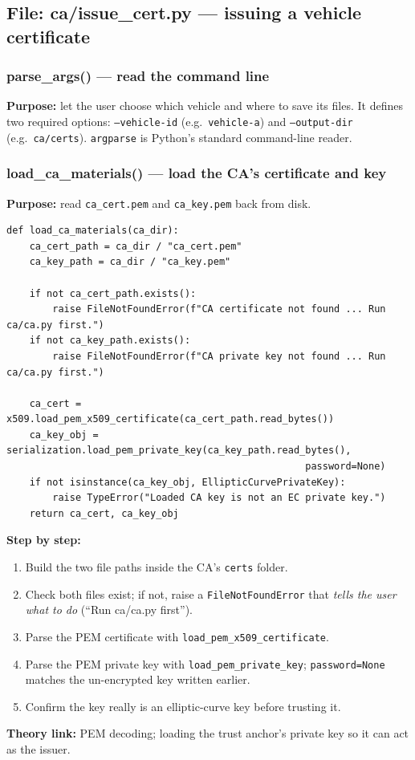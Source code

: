 \documentclass[11pt,a4paper]{article}
\begin{document}
\subsection{File: ca/issue\_cert.py --- issuing a vehicle certificate}

\subsubsection*{parse\_args() --- read the command line}
\textbf{Purpose:} let the user choose which vehicle and where to save its files.
It defines two required options: \texttt{--vehicle-id} (e.g.\ \texttt{vehicle-a})
and \texttt{--output-dir} (e.g.\ \texttt{ca/certs}). \texttt{argparse} is
Python's standard command-line reader.

\subsubsection*{load\_ca\_materials() --- load the CA's certificate and key}
\textbf{Purpose:} read \texttt{ca\_cert.pem} and \texttt{ca\_key.pem} back from disk.
\begin{lstlisting}[style=py,caption={ca/issue\_cert.py --- load the CA so we can sign with it.}]
def load_ca_materials(ca_dir):
    ca_cert_path = ca_dir / "ca_cert.pem"
    ca_key_path = ca_dir / "ca_key.pem"

    if not ca_cert_path.exists():
        raise FileNotFoundError(f"CA certificate not found ... Run ca/ca.py first.")
    if not ca_key_path.exists():
        raise FileNotFoundError(f"CA private key not found ... Run ca/ca.py first.")

    ca_cert = x509.load_pem_x509_certificate(ca_cert_path.read_bytes())
    ca_key_obj = serialization.load_pem_private_key(ca_key_path.read_bytes(),
                                                    password=None)
    if not isinstance(ca_key_obj, EllipticCurvePrivateKey):
        raise TypeError("Loaded CA key is not an EC private key.")
    return ca_cert, ca_key_obj
\end{lstlisting}
\textbf{Step by step:}
\begin{enumerate}
  \item Build the two file paths inside the CA's \texttt{certs} folder.
  \item Check both files exist; if not, raise a \texttt{FileNotFoundError} that
        \emph{tells the user what to do} (``Run ca/ca.py first'').
  \item Parse the PEM certificate with \texttt{load\_pem\_x509\_certificate}.
  \item Parse the PEM private key with \texttt{load\_pem\_private\_key};
        \texttt{password=None} matches the un-encrypted key written earlier.
  \item Confirm the key really is an elliptic-curve key before trusting it.
\end{enumerate}
\textbf{Theory link:} PEM decoding; loading the trust anchor's private key so it
can act as the issuer.
\end{document}
